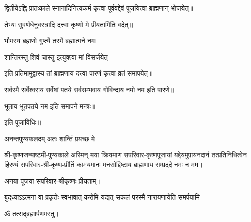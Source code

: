 \begin{center}
द्वितीयेऽह्नि प्रातःकाले स्नानादिनित्यकर्म कृत्वा पूर्ववद्देवं पूजयित्वा ब्राह्मणान् भोजयेत्॥

तेभ्यः सुवर्णधेनुवस्त्रादि दत्त्वा कृष्णो मे प्रीयतामिति वदेत्॥

{भौमस्य ब्रह्मणो गुप्त्यै तस्मै ब्रह्मात्मने नमः}

{शान्तिरस्तु शिवं चास्तु इत्युक्त्वा मां विसर्जयेत्}

इति प्रतिमामुद्वास्य तां ब्राह्मणाय दत्त्वा पारणं कृत्वा व्रतं समापयेत्॥

सर्वस्मै सर्वेश्वराय सर्वेषां पतये सर्वसम्भवाय गोविन्दाय नमो नम इति पारणे॥

भूताय भूतपतये नम इति समापने मन्त्रः॥

इति पूजाविधिः॥

\closesub

{अनन्तपुण्यफलदम् अतः शान्तिं प्रयच्छ मे}

श्री-कृष्णजन्माष्टमी-पुण्यकाले अस्मिन् मया क्रियमाण सपरिवार-कृष्णपूजायां यद्देयमुपायनदानं तत्प्रतिनिधित्वेन हिरण्यं सपरिवार-श्री-कृष्ण-प्रीतिं कामयमानः मनसोद्दिष्टाय ब्राह्मणाय सम्प्रददे नमः न मम। 

अनया पूजया सपरिवार-श्रीकृष्णः प्रीयताम्। 
 
{बुद्‌ध्याऽऽत्मना वा प्रकृतेः स्वभावात्}
{करोमि यद्यत् सकलं परस्मै}
{नारायणायेति समर्पयामि}

ॐ तत्सद्ब्रह्मार्पणमस्तु।

\closesection

\end{center}





\closesection
